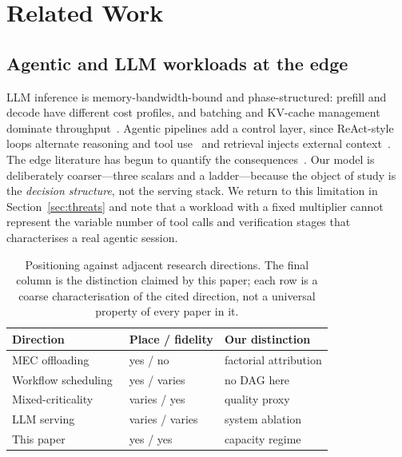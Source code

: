 \documentclass[journal,10pt]{IEEEtran}
\begin{document}
\section{Related Work}
\label{sec:related}

\subsection{Agentic and LLM workloads at the edge}
LLM inference is memory-bandwidth-bound and phase-structured: prefill and decode
have different cost profiles, and batching and KV-cache management dominate
throughput~\cite{kwon2023vllm,pope2023transformer,patel2024splitwise}. Agentic
pipelines add a control layer, since ReAct-style loops alternate reasoning and
tool use~\cite{yao2023react} and retrieval injects external
context~\cite{lewis2020rag}. The edge literature has begun to quantify the
consequences~\cite{chen2026agenticenergy,he2026workflow,liu2026aigc,chari2026ragam}.
Our model is deliberately coarser---three scalars and a ladder---because the
object of study is the \emph{decision structure}, not the serving stack. We
return to this limitation in Section~\ref{sec:threats} and note that a workload
with a fixed multiplier cannot represent the variable number of tool calls and
verification stages that characterises a real agentic session.

\begin{table}[t]
\centering
\footnotesize
\caption{Positioning against adjacent research directions. The final column is
the distinction claimed by this paper; each row is a coarse characterisation of
the cited direction, not a universal property of every paper in it.}
\label{tab:p2-related}
\begin{tabular}{@{}lll@{}}
\toprule
Direction & Place / fidelity & Our distinction\\
\midrule
MEC offloading~\cite{mao2017survey} & yes / no & factorial attribution\\
Workflow scheduling~\cite{he2026workflow} & yes / varies & no DAG here\\
Mixed-criticality~\cite{liu1973scheduling} & varies / yes & quality proxy\\
LLM serving~\cite{kwon2023vllm} & varies / varies & system ablation\\
This paper & yes / yes & capacity regime\\
\bottomrule
\end{tabular}
\end{table}
\end{document}
